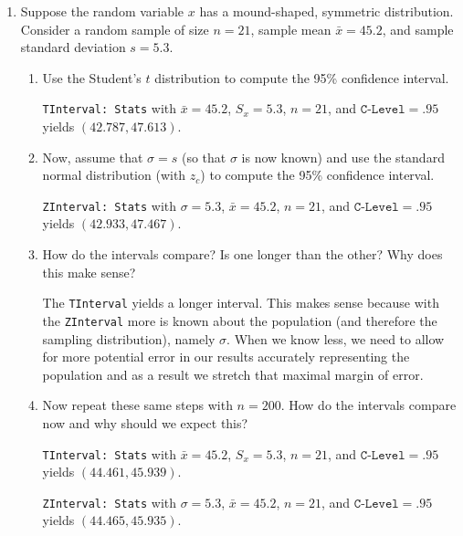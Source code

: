 \documentclass{article}
\newcommand{\answer}[1]{\color{white}#1}
\begin{document}
\pagestyle{myheadings}

\begin{center}
\textbf{}
\end{center}

\begin{enumerate}


\item Suppose the random variable $x$ has a mound-shaped, symmetric distribution.  Consider a random sample of size $n=21$, sample mean $\bar x = 45.2$, and sample standard deviation $s = 5.3$.
	\begin{enumerate}
	\item Use the Student's $t$ distribution to compute the 95\% confidence interval. 
	
	{\answer \texttt{TInterval: Stats} 
	with $\bar{x} = 45.2$, $S_x = 5.3$, $n=21$, and $\texttt{C-Level} = .95$ yields $(42.787, 47.613)$.
	} 
	
	\item Now, assume that $\sigma = s$ (so that $\sigma$ is now known) and use the standard normal distribution (with $z_c$) to compute the 95\% confidence interval. 
	
	{\answer \texttt{ZInterval: Stats} 
	with $\sigma = 5.3$, $\bar{x} = 45.2$, $n=21$, and $\texttt{C-Level} = .95$ yields $(42.933, 47.467)$.
	} 
	
	\item How do the intervals compare?  Is one longer than the other?  Why does this make sense? 
	
	{\answer The \texttt{TInterval} yields a longer interval.  This makes sense because with the \texttt{ZInterval} more is known about the population (and therefore the sampling distribution), namely $\sigma$.  When we know less, we need to allow for more potential error in our results accurately representing the population and as a result we stretch that maximal margin of error.
	} 
	
	\item Now repeat these same steps with $n=200$.  How do the intervals compare now and why should we expect this? 
	
	{\answer \texttt{TInterval: Stats} 
	with $\bar{x} = 45.2$, $S_x = 5.3$, $n=21$, and $\texttt{C-Level} = .95$ yields $(44.461, 45.939)$.
	
	\texttt{ZInterval: Stats} 
	with $\sigma = 5.3$, $\bar{x} = 45.2$, $n=21$, and $\texttt{C-Level} = .95$ yields $(44.465, 45.935)$.
	
}
\end{enumerate}
\end{enumerate}
\end{document}
